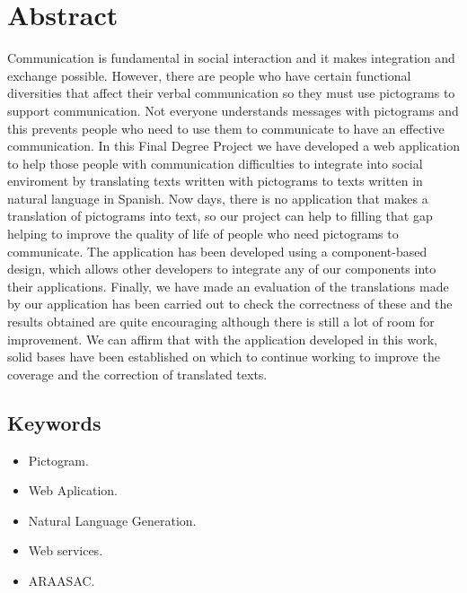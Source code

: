 
\chapter*{Abstract}

Communication is fundamental in social interaction and it makes integration and exchange possible. However, there are people who have certain functional diversities that affect their verbal communication so they must use pictograms to support communication.
Not everyone understands messages with pictograms and this prevents people who need to use them to communicate to have an effective communication. In this Final Degree Project we have developed a web application to help those people with communication difficulties to integrate into social enviroment by translating texts written with pictograms to texts written in natural language in Spanish. Now days, there is no application that makes a translation of pictograms into text, so our project can help to filling that gap helping to improve the quality of life of people who need pictograms to communicate.
The application has been developed using a component-based design, which allows other developers to integrate any of our components into their applications.
Finally, we have made an evaluation of the translations made by our application has been carried out to check the correctness of these and the results obtained are quite encouraging although there is still a lot of room for improvement. We can affirm that with the application developed in this work, solid bases have been established on which to continue working to improve the coverage and the correction of translated texts.


\clearpage  

\section*{Keywords}

\begin{itemize}
    \item Pictogram.
    \item Web Aplication.
    \item Natural Language Generation.
    \item Web services.
    \item ARAASAC.
\end{itemize}



   


   